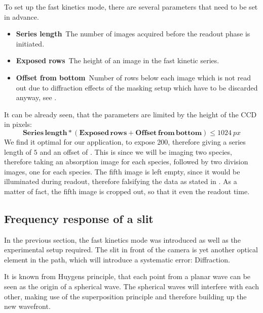 To set up the fast kinetics mode, there are several parameters that need to be set in advance.
\begin{itemize}
	\item \textbf{Series length}\, The number of images acquired before the readout phase is initiated.
	\item \textbf{Exposed rows}\, The height of an image in the fast kinetic series.
	\item \textbf{Offset from bottom}\, Number of rows below each image which is not read out due to diffraction effects of the masking setup which have to be discarded anyway, see .
\end{itemize}

It can be already seen, that the parameters are limited by the height of the CCD in pixels:
\begin{equation}
\mathbf{Series\,length} * (\mathbf{Exposed\,rows} + \mathbf{Offset\,from\,bottom}) \leq \SI{1024}{px}
\end{equation}
We find it optimal for our application, to expose \SI{200}{\px}, therefore giving a series length of $5$ and an offset of . This is since we will be imaging two species, therefore taking an absorption image for each species, followed by two division images, one for each species. The fifth image is left empty, since it would be illuminated during readout, therefore falsifying the data as stated in . As a matter of fact, the fifth image is cropped out, so that it even the readout time.

\subsection{Frequency response of a slit}
\label{subsec:slit}

In the previous section, the fast kinetics mode was introduced as well as the experimental setup required. The slit in front of the camera is yet another optical element in the path, which will introduce a systematic error: Diffraction.

It is known from Huygens principle, that each point from a planar wave can be seen as the origin of a spherical wave. The spherical waves will interfere with each other, making use of the superposition principle and therefore building up the new wavefront.

